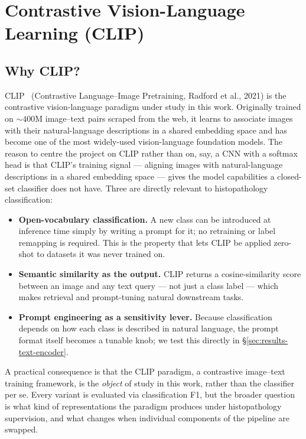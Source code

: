 \section{Contrastive Vision-Language Learning (CLIP)}
\label{sec:meth-clip}

\subsection{Why CLIP?}

CLIP~\cite{radford2021clip} (Contrastive Language--Image Pretraining, Radford et al., 2021) is the contrastive vision-language paradigm under study in this work. Originally trained on $\sim 400$M image--text pairs scraped from the web, it learns to associate images with their natural-language descriptions in a shared embedding space and has become one of the most widely-used vision-language foundation models. The reason to centre the project on CLIP rather than on, say, a CNN with a softmax head is that CLIP's training signal --- aligning images with natural-language descriptions in a shared embedding space --- gives the model capabilities a closed-set classifier does not have. Three are directly relevant to histopathology classification:

\begin{itemize}
    \item \textbf{Open-vocabulary classification.} A new class can be introduced at inference time simply by writing a prompt for it; no retraining or label remapping is required. This is the property that lets CLIP be applied zero-shot to datasets it was never trained on.
    \item \textbf{Semantic similarity as the output.} CLIP returns a cosine-similarity score between an image and any text query --- not just a class label --- which makes retrieval and prompt-tuning natural downstream tasks.
    \item \textbf{Prompt engineering as a sensitivity lever.} Because classification depends on how each class is described in natural language, the prompt format itself becomes a tunable knob; we test this directly in §\ref{sec:results-text-encoder}.
\end{itemize}

A practical consequence is that the CLIP paradigm, a contrastive image--text training framework, is the \emph{object} of study in this work, rather than the classifier per se. Every variant is evaluated via classification F1, but the broader question is what kind of representations the paradigm produces under histopathology supervision, and what changes when individual components of the pipeline are swapped.

